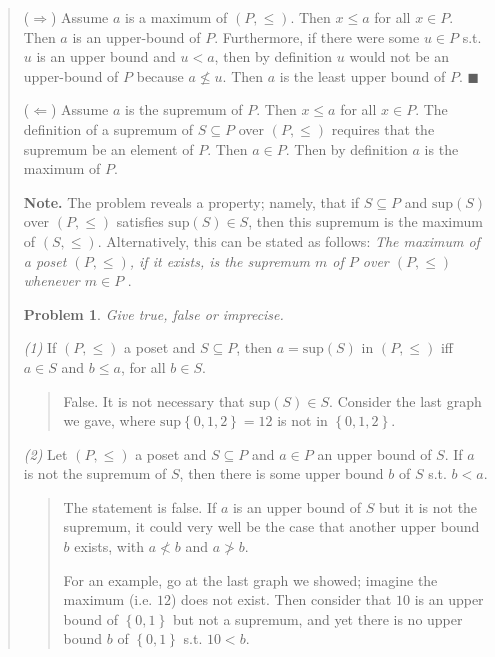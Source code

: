 \documentclass[a4paper, 12pt]{article}
\newtheorem{problem}{Problem}
\newtheorem{problem}{Problem}
\begin{document}
\begin{quote}
($\Rightarrow$) Assume $a$ is a maximum of $(P, \leq) $. Then $x \leq a$ for all
$x \in P$. Then $a$ is an upper-bound of $P$. Furthermore, if there were some $u
\in P$ s.t. $u$ is an upper bound and $u < a$, then by definition $u$ would not
be an upper-bound of $P$ because $a \not\leq u$. Then $a$ is the least upper
bound of $P$. $\blacksquare$

($\Leftarrow$) Assume $a$ is the supremum of $P$. Then $x \leq a$ for all $x \in
P$. The definition of a supremum of $S \subseteq P$ over $(P, \leq) $ requires
that the supremum be an element of $P$. Then $a \in P$. Then by definition $a$
is the maximum of $P$.

\textbf{Note.} The problem reveals a property; namely, that if $S \subseteq P$
and $\text{sup}(S)$ over $(P, \leq) $ satisfies $\text{sup}(S) \in S$, then this
supremum is the maximum of $(S, \leq)$. Alternatively, this can be stated as
follows: \textit{The maximum of a poset $(P, \leq) $, if it exists, is the
supremum $m$ of $P$ over $(P, \leq) $ whenever $m \in P$ }.

\begin{problem}
    Give true, false or imprecise.
\end{problem}

\textit{(1)} If $(P, \leq) $ a poset and $S \subseteq P$, then $a =
\text{sup}(S)$ in $(P, \leq) $ iff $a \in S$ and $b \leq a$, for all $b \in  S$.

\begin{quote}
    False. It is not necessary that $\text{sup}(S) \in S$. Consider the last
    graph we gave, where $\text{sup}\left\{ 0, 1, 2 \right\} = 12 $ is not in $\left\{
    0, 1, 2 \right\} $.
\end{quote}

\textit{(2)} Let $(P, \leq) $ a poset and $S \subseteq P$ and $a \in P$ an upper
bound of $S$. If $a$ is not the supremum of $S$, then there is some upper bound
$b$ of $S$ s.t. $b < a$.

\begin{quote}
    The statement is false. If $a$ is an upper bound of $S$ but it is not the supremum,
    it could very well be the case that another upper bound $b$ exists, with $a
    \not < b$ and $a \not > b$. 

    For an example, go at the last graph we showed;
    imagine the maximum (i.e. $12$) does not exist. Then consider that $10$ is
    an upper bound of $\left\{ 0, 1 \right\} $ but not a supremum, and yet there
    is no upper bound $b$ of $\left\{ 0, 1 \right\} $ s.t. $10 < b$.



\end{quote}
\end{quote}
\end{document}
